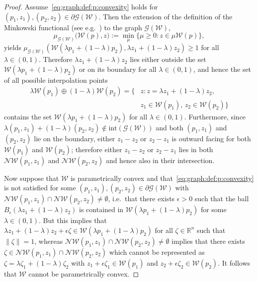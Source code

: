 \documentclass[final]{elsarticle}
\theoremstyle{remark}
\theoremstyle{definition}
\begin{document}
%
\begin{proof}
%
Assume~\eqref{eq:graph:def:p:convexity} holds for $(p_1,z_1),(p_2,z_2)\in\partial\mathscr G(\mathcal W)$.
%
Then the extension of the definition of the Minkowski functional (see e.g.~\cite{Rudin:91}) to the graph $\mathscr G(\mathcal W)$,
\[
\mu_{\mathscr G(\mathcal W)} \bigl(
\mathcal W(p), z \bigr)
:= \min_\mu \{\mu \geq 0 : z \in \mu \mathcal W(p)\},
\]
yields $\mu_{\mathscr G(\mathcal W)}\left(\mathcal W(\lambda p_1 + (1-\lambda)p_2),\lambda z_1+(1-\lambda)z_2\right)\geq1$ for all $\lambda\in(0,1)$. Therefore $\lambda z_1 + (1-\lambda) z_2$
lies either outside the set $\mathcal W(\lambda p_1+(1-\lambda)p_2)$ or on its boundary for all $\lambda\in(0,1)$, and hence the set of all possible interpolation points 
%
\[
\begin{split}
  \lambda \mathcal W(p_1)\oplus (1-\lambda)\mathcal W(p_2) = \{&z : z=\lambda z_1 + (1-\lambda) z_2,\\ &z_1\in\mathcal  W(p_1),\, z_2\in\mathcal W(p_2)\}
\end{split}
\]
%
contains the set $\mathcal W(\lambda p_1 + (1-\lambda)p_2)$ for all $\lambda\in(0,1)$.
%
Furthermore, since $\lambda(p_1,z_1)+(1-\lambda)(p_2,z_2)\not\in \text{int}(\mathscr G(\mathcal W))$ and both $(p_1,z_1)$ and $(p_2,z_2)$ lie on the boundary, either $z_1-z_2$ or $z_2-z_1$ is outward facing for both $\mathcal W(p_1)$ and $\mathcal W(p_2)$; therefore either $z_1-z_2$ or $z_2-z_1$ lies in both $\mathcal N\mathcal W(p_1,z_1)$ and $\mathcal N\mathcal W(p_2,z_2)$ and hence also in their intersection.

Now suppose that $\mathcal W$ is parametrically convex and that~\eqref{eq:graph:def:p:convexity} is not satisfied for 
some $(p_1,z_1),(p_2,z_2)\in\partial\mathscr G(\mathcal W)$ with $\mathcal N\mathcal W(p_1,z_1)\cap\mathcal 
N\mathcal W(p_2,z_2)\neq\emptyset$, 
%
i.e.~that there exists $\epsilon>0$ such that the ball
$B_\epsilon(\lambda z_1 + (1-\lambda)z_2 )$
is contained in $\mathcal W(\lambda p_1 + (1-\lambda)p_2)$ for some $\lambda \in (0,1)$.
%
But this implies that $\lambda z_1 + (1-\lambda) z_2 + \epsilon\zeta \in \mathcal W(\lambda p_1+(1-\lambda)p_2)$  for all $\zeta\in\mathbb R^n$ such that $\|\zeta\| = 1$, whereas
$\mathcal N\mathcal W(p_1,z_1)\cap\mathcal N\mathcal W(p_2,z_2)\neq\emptyset$ implies that there exists 
$\zeta \in\mathcal N\mathcal W(p_1,z_1)\cap\mathcal N\mathcal W(p_2,z_2)$ which cannot be represented as
$\zeta =\lambda \zeta_1+
(1-\lambda)\zeta_2$
with $z_1 + \epsilon \zeta_1\in\mathcal W(p_1)$ and $z_2  + \epsilon \zeta_2\in\mathcal W(p_2)$.
%
It follows that $\mathcal W$ cannot be parametrically convex.
\end{proof}
%
\end{document}
